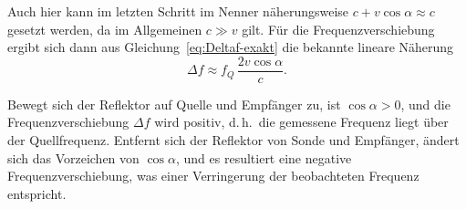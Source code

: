 \documentclass[
	german,%
	accentcolor=3d,%
	type=intern, %
	marginpar=false,%
]{tudapub}
\begin{document}
      Auch hier kann im letzten Schritt im Nenner näherungsweise \(c + v \cos\alpha \approx c\) gesetzt werden, da im Allgemeinen \(c \gg v\) gilt. Für die Frequenzverschiebung ergibt sich dann aus Gleichung~\eqref{eq:Deltaf-exakt} die bekannte lineare Näherung
      \begin{equation}
         \Delta f \approx f_Q \,\frac{2 v \cos\alpha}{c} .
         \label{eq:doppler-deltaf-standard}
      \end{equation}

      Bewegt sich der Reflektor auf Quelle und Empfänger zu, ist \(\cos\alpha > 0\), und die Frequenzverschiebung \(\Delta f\) wird positiv, d.\,h.\ die gemessene Frequenz liegt über der Quellfrequenz. Entfernt sich der Reflektor von Sonde und Empfänger, ändert sich das Vorzeichen von \(\cos\alpha\), und es resultiert eine negative Frequenzverschiebung, was einer Verringerung der beobachteten Frequenz entspricht.
\end{document}
